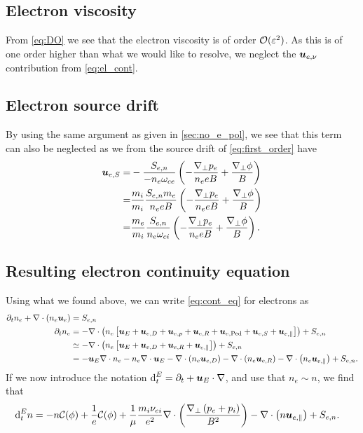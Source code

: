 \subsection{Electron viscosity}
%
From \cref{eq:DO} we see that the electron viscosity is of order $\mathcal{O}(\varepsilon^2)$.
As this is of one order higher than what we would like to resolve, we neglect the $\boldsymbol{u}_{e,\nu}$ contribution from \cref{eq:el_cont}.

\subsection{Electron source drift}
\label{sec:no_e_source}
%
By using the same argument as given in \cref{sec:no_e_pol}, we see that this term can also be neglected as we from the source drift of \cref{eq:first_order} have
%
\begin{align*}
    \ve{u}_{e,S}
    =&
    - \frac{ S_{e,n}}{-n_e \om_{ce}}
    \L(- \frac{\grad_\perp p_e}{n_e e B}
  + \frac{\grad_\perp \phi}{B} \R)
  \\
%
  =&
  \frac{m_i}{m_i}
  \frac{ S_{e,n} m_e}{n_e e B} \L(
  - \frac{\grad_\perp p_e}{n_e e B}
  + \frac{\grad_\perp \phi}{B} \R)
  \\
%
  =&
   \frac{m_e}{m_i} \frac{ S_{e,n}}{n_e \om_{ci}} \L(
   -
  \frac{\grad_\perp p_e}{n_e e B}
  + \frac{\grad_\perp \phi}{B}
  \R).
\end{align*}

\subsection{Resulting electron continuity equation}
%
Using what we found above, we can write \cref{eq:cont_eq} for electrons as
%
\begin{align*}
    \partial_t n_e + \div\L(n_e\ve{u}_e\R)
    &= S_{e,n}
    \\
%
    \partial_t n_e
    &=
    - \div\L(n_e\L[ \ve{u}_E
    + \ve{u}_{e,D}
    + \ve{u}_{e,p}
    + \ve{u}_{e,R}
    + \ve{u}_{e,\text{Ped}}
    + \ve{u}_{e,S}
    + \ve{u}_{e,\|} \R]\R)
    + S_{e,n}
    \\
%
    &\simeq
    - \div\L(n_e\L[\ve{u}_E + \ve{u}_{e,D} + \ve{u}_{e,R} + \ve{u}_{e,\|}\R]\R)
    + S_{e,n}
    \\
%
    &=
    - \ve{u}_E\nabla\cdot n_e
    - n_e\div\ve{u}_E
    - \div\L(n_e \ve{u}_{e,D}\R)
    - \div\L(n_e \ve{u}_{e,R}\R)
    - \div\L(n_e \ve{u}_{e,\|}\R)
    + S_{e,n}.
\end{align*}
%
If we now introduce the notation $\text{d}_t^E = \partial_t + \boldsymbol{u}_E\cdot\nabla$, and use that $n_e\sim n$, we find that
%
\begin{align}
    \text{d}_t^E n
    &=
    - n\mathcal{C}(\phi)
    + \frac{1}{e}\mathcal{C}(\phi)
    +\frac{1}{\mu}\frac{m_i\nu_{ei}}{e^2}
    \nabla\cdot\left( \frac{\nabla_\perp \left(p_e + p_i\right)}{B^2} \right)
    - \nabla\cdot\left(n \boldsymbol{u}_{e,\|}\right)
    + S_{e,n}.
    \label{eq:dens_evol_gen}
\end{align}

